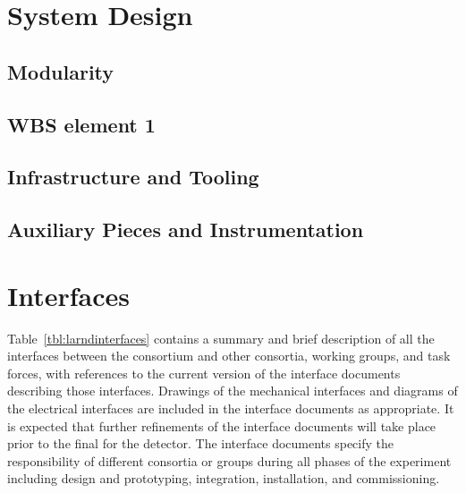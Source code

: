\section{System Design}
\label{sec:lartpc-des}

\subsection{Modularity}
\label{sec:lartpc-des-struc}

\subsection{WBS element 1}
\label{sec:lartpc-des-wbs1}

\subsection{Infrastructure and Tooling}
\label{sec:lartpc-des-infr}

\subsection{Auxiliary Pieces and Instrumentation}
\label{sec:lartpc-des-aux}

\section{Interfaces}
\label{sec:lartpc-interface}

Table~\ref{tbl:larndinterfaces} contains a summary and brief description of all the interfaces between the  consortium and other consortia, working groups, and task forces, with references to the current version of the interface documents describing those interfaces.  
Drawings of the mechanical interfaces and diagrams of the electrical interfaces are 
included in the interface documents as appropriate.
It is expected that further refinements of the interface documents will take place prior to the final  for the detector. The interface documents specify the responsibility of different consortia or groups during all phases of the experiment including design and prototyping, integration,  installation, and  commissioning.



